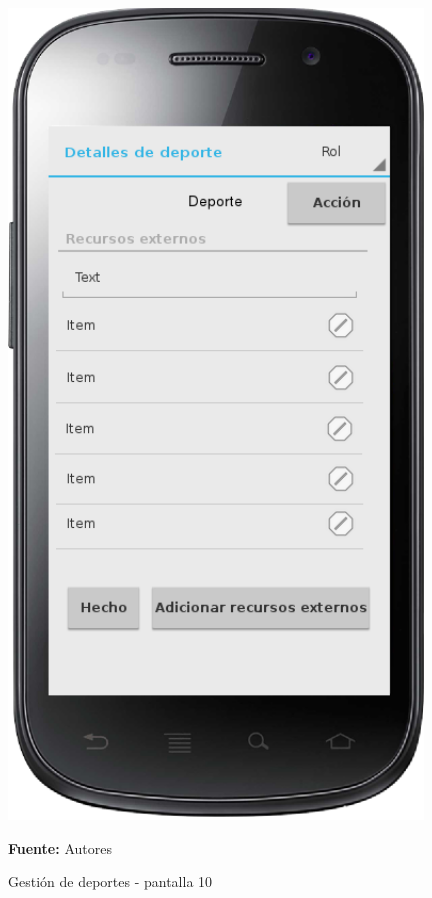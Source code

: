 \begin{figure}[!htb]
  \begin{center}
    \includegraphics[width=11cm]{./imagenes/UI/Deportes/gestion_deportes_10.png}
    \caption{Gestión de deportes - pantalla 10}
    \label{fig:gestion_deportes_}
    \textbf{Fuente:}  Autores
  \end{center}
\end{figure}

